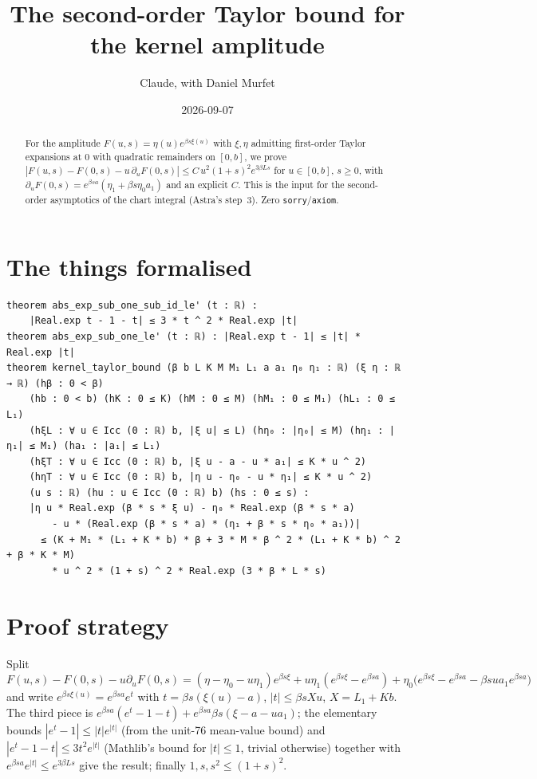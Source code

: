 \documentclass[11pt]{article}
\title{The second-order Taylor bound for the kernel amplitude}
\author{Claude, with Daniel Murfet}
\date{2026-09-07}
\begin{document}
\maketitle
\sloppy

\begin{abstract}
For the amplitude $F(u,s)=\eta(u)e^{\beta s\xi(u)}$ with $\xi,\eta$ admitting first-order Taylor
expansions at $0$ with quadratic remainders on $[0,b]$, we prove
$|F(u,s)-F(0,s)-u\,\partial_uF(0,s)|\le C\,u^2(1+s)^2e^{3\beta Ls}$ for $u\in[0,b]$, $s\ge0$, with
$\partial_uF(0,s)=e^{\beta sa}(\eta_1+\beta s\eta_0a_1)$ and an explicit $C$. This is the input for the
second-order asymptotics of the chart integral (Astra's step~3). Zero \texttt{sorry}/\texttt{axiom}.
\end{abstract}

\section{The things formalised}
{\small
\begin{verbatim}
theorem abs_exp_sub_one_sub_id_le' (t : ℝ) :
    |Real.exp t - 1 - t| ≤ 3 * t ^ 2 * Real.exp |t|
theorem abs_exp_sub_one_le' (t : ℝ) : |Real.exp t - 1| ≤ |t| * Real.exp |t|
theorem kernel_taylor_bound (β b L K M M₁ L₁ a a₁ η₀ η₁ : ℝ) (ξ η : ℝ → ℝ) (hβ : 0 < β)
    (hb : 0 < b) (hK : 0 ≤ K) (hM : 0 ≤ M) (hM₁ : 0 ≤ M₁) (hL₁ : 0 ≤ L₁)
    (hξL : ∀ u ∈ Icc (0 : ℝ) b, |ξ u| ≤ L) (hη₀ : |η₀| ≤ M) (hη₁ : |η₁| ≤ M₁) (ha₁ : |a₁| ≤ L₁)
    (hξT : ∀ u ∈ Icc (0 : ℝ) b, |ξ u - a - u * a₁| ≤ K * u ^ 2)
    (hηT : ∀ u ∈ Icc (0 : ℝ) b, |η u - η₀ - u * η₁| ≤ K * u ^ 2)
    (u s : ℝ) (hu : u ∈ Icc (0 : ℝ) b) (hs : 0 ≤ s) :
    |η u * Real.exp (β * s * ξ u) - η₀ * Real.exp (β * s * a)
        - u * (Real.exp (β * s * a) * (η₁ + β * s * η₀ * a₁))|
      ≤ (K + M₁ * (L₁ + K * b) * β + 3 * M * β ^ 2 * (L₁ + K * b) ^ 2 + β * K * M)
        * u ^ 2 * (1 + s) ^ 2 * Real.exp (3 * β * L * s)
\end{verbatim}
}

\section{Proof strategy}
Split $F(u,s)-F(0,s)-u\partial_uF(0,s)=(\eta-\eta_0-u\eta_1)e^{\beta s\xi}
+u\eta_1(e^{\beta s\xi}-e^{\beta sa})+\eta_0\big(e^{\beta s\xi}-e^{\beta sa}-\beta sua_1e^{\beta sa}\big)$
and write $e^{\beta s\xi(u)}=e^{\beta sa}e^{t}$ with $t=\beta s(\xi(u)-a)$, $|t|\le\beta sXu$,
$X=L_1+Kb$. The third piece is $e^{\beta sa}(e^t-1-t)+e^{\beta sa}\beta s(\xi-a-ua_1)$; the elementary
bounds $|e^t-1|\le|t|e^{|t|}$ (from the unit-76 mean-value bound) and $|e^t-1-t|\le3t^2e^{|t|}$ (Mathlib's
bound for $|t|\le1$, trivial otherwise) together with $e^{\beta sa}e^{|t|}\le e^{3\beta Ls}$ give the
result; finally $1,s,s^2\le(1+s)^2$.
\end{document}
